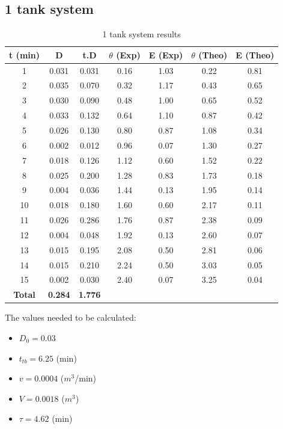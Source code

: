 \subsection{1 tank system}
\begin{table}[H]
    \centering
    \caption{1 tank system results}
    \begin{tabular}{ccccccc}
        \hline
        \textbf{t (min)} & \textbf{D} & \textbf{t.D} & \textbf{$\theta$ (Exp)} & \textbf{E (Exp)} & \textbf{$\theta$ (Theo)} & \textbf{E (Theo)} \\
        \hline
        1 & 0.031 & 0.031 & 0.16 & 1.03 & 0.22 & 0.81 \\
        2 & 0.035 & 0.070 & 0.32 & 1.17 & 0.43 & 0.65 \\
        3 & 0.030 & 0.090 & 0.48 & 1.00 & 0.65 & 0.52 \\
        4 & 0.033 & 0.132 & 0.64 & 1.10 & 0.87 & 0.42 \\
        5 & 0.026 & 0.130 & 0.80 & 0.87 & 1.08 & 0.34 \\
        6 & 0.002 & 0.012 & 0.96 & 0.07 & 1.30 & 0.27 \\
        7 & 0.018 & 0.126 & 1.12 & 0.60 & 1.52 & 0.22 \\
        8 & 0.025 & 0.200 & 1.28 & 0.83 & 1.73 & 0.18 \\
        9 & 0.004 & 0.036 & 1.44 & 0.13 & 1.95 & 0.14 \\
        10 & 0.018 & 0.180 & 1.60 & 0.60 & 2.17 & 0.11 \\
        11 & 0.026 & 0.286 & 1.76 & 0.87 & 2.38 & 0.09 \\
        12 & 0.004 & 0.048 & 1.92 & 0.13 & 2.60 & 0.07 \\
        13 & 0.015 & 0.195 & 2.08 & 0.50 & 2.81 & 0.06 \\
        14 & 0.015 & 0.210 & 2.24 & 0.50 & 3.03 & 0.05 \\
        15 & 0.002 & 0.030 & 2.40 & 0.07 & 3.25 & 0.04 \\
        \hline
        \textbf{Total} & \textbf{0.284} & \textbf{1.776} & & & & \\
        \hline
    \end{tabular}
\end{table}

The values needed to be calculated:
\begin{itemize}
    \item $D_0 = 0.03$
    \item $t_{tb} = 6.25$ (min)
    \item $v = 0.0004$ ($m^3$/min)
    \item $V = 0.0018$ ($m^3$)
    \item $\tau = 4.62$ (min)
\end{itemize}

